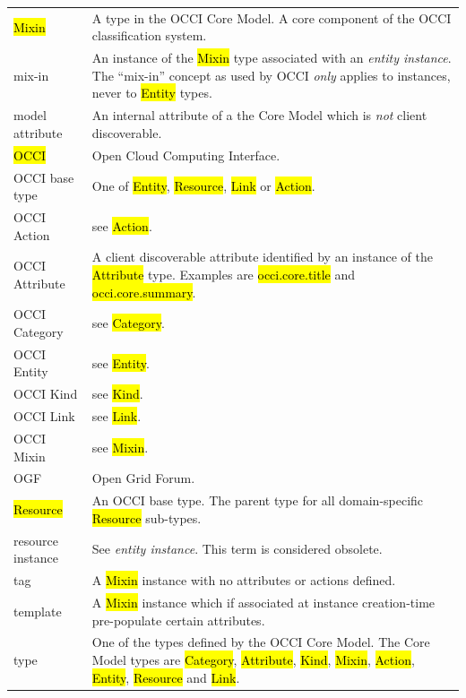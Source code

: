 \documentclass[10pt,a4paper]{article}
\begin{document}
\begin{tabular}{l|p{12cm}}
\hl{Mixin} & A type in the OCCI Core Model. A core component of the OCCI classification system. \\

mix-in & An instance of the \hl{Mixin} type associated with an {\em entity
 instance}. The ``mix-in'' concept as used by OCCI {\em only} applies to
 instances, never to \hl{Entity} types. \\

model attribute & An internal attribute of a the Core Model which is {\em not}
  client discoverable. \\

\hl{OCCI} & Open Cloud Computing Interface. \\

OCCI base type & One of \hl{Entity}, \hl{Resource}, \hl{Link} or \hl{Action}. \\

OCCI Action & see \hl{Action}. \\
OCCI Attribute & A client discoverable attribute identified by an instance of the \hl{Attribute} type. Examples are \hl{occi.core.title} and \hl{occi.core.summary}. \\
OCCI Category & see \hl{Category}. \\
OCCI Entity & see \hl{Entity}. \\
OCCI Kind & see \hl{Kind}. \\
OCCI Link & see \hl{Link}. \\
OCCI Mixin & see \hl{Mixin}. \\

OGF & Open Grid Forum. \\

\hl{Resource} & An OCCI base type. The parent type for all domain-specific \hl{Resource} sub-types. \\

resource instance & See {\em entity instance}. This term is considered obsolete. \\

tag & A \hl{Mixin} instance with no attributes or actions defined. \\

template & A \hl{Mixin} instance which if associated at instance
creation-time pre-populate certain attributes. \\

type & One of the types defined by the OCCI Core Model.  The Core Model types are
 \hl{Category}, \hl{Attribute},
 \hl{Kind}, \hl{Mixin}, \hl{Action}, \hl{Entity}, \hl{Resource}
 and \hl{Link}. \\


\end{tabular}
\end{document}
